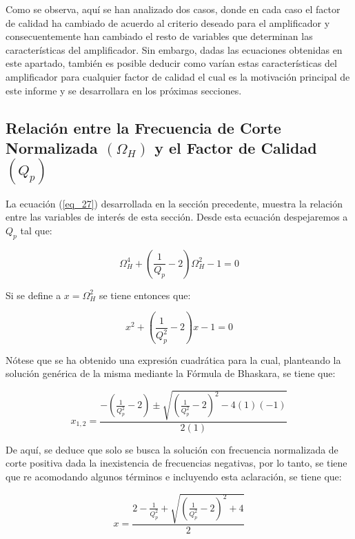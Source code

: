 \documentclass[12pt,a4paper]{article}
\begin{document}
Como se observa, aquí se han analizado dos casos, donde en cada caso el factor de calidad ha cambiado de acuerdo al criterio deseado para el amplificador y consecuentemente han cambiado el resto de variables que determinan las características del amplificador. Sin embargo, dadas las ecuaciones obtenidas en este apartado, también es posible deducir como varían estas características del amplificador para cualquier factor de calidad el cual es la motivación principal de este informe y se desarrollara en los próximas secciones.


\subsection{Relación entre la Frecuencia de Corte Normalizada $(\Omega_H)$ y el Factor de Calidad $(Q_p)$}
La ecuación (\ref{eq_27}) desarrollada en la sección precedente, muestra la relación entre las variables de interés de esta sección. Desde esta ecuación despejaremos a $Q_{p}$ tal que:

\begin{equation}
    \label{eq_35}
    \Omega_{H}^{4} + \left(\frac{1}{Q_{p}} - 2\right)\Omega_{H}^{2} - 1 = 0
\end{equation}

Si se define a $x = \Omega_{H}^{2}$ se tiene entonces que:

\begin{equation}
    \label{eq_36}
    x^{2} + \left(\frac{1}{Q_{p}^{2}} - 2\right)x - 1 = 0
\end{equation}

Nótese que se ha obtenido una expresión cuadrática para la cual, planteando la solución genérica de la misma mediante la Fórmula de Bhaskara, se tiene que:

\begin{equation}
    \label{eq_37}
    x_{1,2} = \frac{-\left(\frac{1}{Q_{p}^{2}} - 2\right) \pm \sqrt{\left(\frac{1}{Q_{p}^{2}} - 2\right)^{2} - 4(1)(-1)}}{2(1)}
\end{equation}

De aquí, se deduce que solo se busca la solución con frecuencia normalizada de corte positiva dada la inexistencia de frecuencias negativas, por lo tanto, se tiene que re acomodando algunos términos e incluyendo esta aclaración, se tiene que:

\begin{equation}
    \label{eq_38}
    x = \frac{2 - \frac{1}{Q_{p}^{2}} + \sqrt{\left(\frac{1}{Q_{p}^{2}} - 2\right)^{2} + 4}}{2}
\end{equation}
\end{document}
